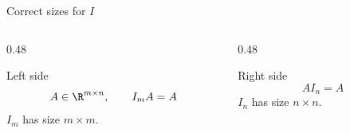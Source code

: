 \begin{frame}{Correct sizes for $I$}
  \begin{columns}[T,onlytextwidth]
    \begin{column}{0.48\textwidth}
      \begin{block}{Left side}
        \[
        A\in\R^{m\times n},\qquad I_mA=A
        \]
        $I_m$ has size $m\times m$.
      \end{block}
    \end{column}
    \begin{column}{0.48\textwidth}
      \begin{exampleblock}{Right side}
        \[
        AI_n=A
        \]
        $I_n$ has size $n\times n$.
      \end{exampleblock}
    \end{column}
  \end{columns}
  \vspace{0.55cm}
\end{frame}
